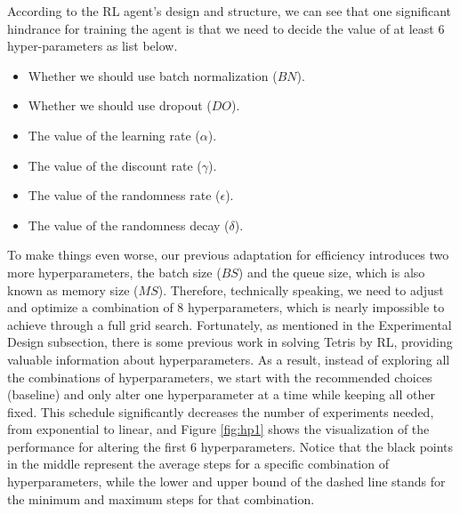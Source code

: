 \documentclass[letterpaper]{article} %
\begin{document}
\begin{itemize}
  According to the RL agent's design and structure, we can see that one significant hindrance for training the agent is that we need to decide the value of at least $6$ hyper-parameters as list below.
  \begin{itemize}
    \item 
    Whether we should use batch normalization ($BN$).
    \item 
    Whether we should use dropout ($DO$).
    \item 
    The value of the learning rate ($\alpha$).
    \item 
    The value of the discount rate ($\gamma$).
    \item 
    The value of the randomness rate ($\epsilon$).
    \item 
    The value of the randomness decay ($\delta$).
  \end{itemize}
  To make things even worse, our previous adaptation for efficiency introduces two more hyperparameters, the batch size ($BS$) and the queue size, which is also known as memory size ($MS$). Therefore, technically speaking, we need to adjust and optimize a combination of $8$ hyperparameters, which is nearly impossible to achieve through a full grid search. Fortunately, as mentioned in the Experimental Design subsection, there is some previous work in solving Tetris by RL, providing valuable information about hyperparameters. As a result, instead of exploring all the combinations of hyperparameters, we start with the recommended choices (baseline) and only alter one hyperparameter at a time while keeping all other fixed. This schedule significantly decreases the number of experiments needed, from exponential to linear, and Figure \ref{fig:hp1} shows the visualization of the performance for altering the first $6$ hyperparameters. Notice that the black points in the middle represent the average steps for a specific combination of hyperparameters, while the lower and upper bound of the dashed line stands for the minimum and maximum steps for that combination.


\end{itemize}
\end{document}
